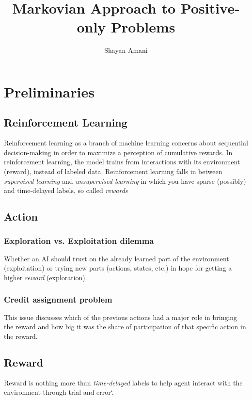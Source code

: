 \documentclass[a4paper,12pt]{article}
\title{Markovian Approach to Positive-only Problems}
\author{Shayan Amani}
\begin{document}
\maketitle


\section{Preliminaries}

\subsection{Reinforcement Learning}
Reinforcement learning as a branch of machine learning concerns about sequential decision-making in order to maximize a perception of cumulative rewards. In reinforcement learning, the model trains from interactions with its environment (reward), instead of labeled data. Reinforcement learning falls in between \textit{supervised learning} and \textit{unsupervised learning} in which you have sparse (possibly) and time-delayed labels, so called \textit{rewards} 

\subsection{Action}

\subsubsection{Exploration vs. Exploitation dilemma}
Whether an AI should trust on the already learned part of the environment (exploitation) or trying new parts (actions, states, etc.) in hope for getting a higher \textit{reward} (exploration). 

\subsubsection{Credit assignment problem}
This issue discusses which of the previous actions had a major role in bringing the reward and how big it was the share of participation of that specific action in the reward.

\subsection{Reward}
Reward is nothing more than \textit{time-delayed} labels to help agent interact with the environment through trial and error`. 
\end{document}
